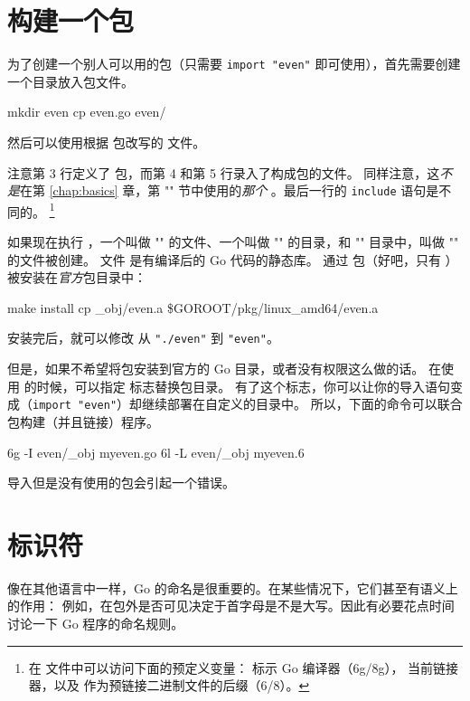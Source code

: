 \section{构建一个包}
\label{sec:building a package}
为了创建一个别人可以用的包（只需要 \lstinline{import "even"} 即可使用），首先需要创建一个目录放入包文件。
\begin{display}
\pr mkdir even
\pr cp even.go even/
\end{display}
\noindent{}然后可以使用根据  包改写的  文件。

注意第 3 行定义了  包，而第 4 和第 5 行录入了构成包的文件。
同样注意，这\emph{不是}在第 \ref{chap:basics} 章，第 ""
节中使用的\emph{那个} 。最后一行的 \verb|include| 语句是不同的。
\footnote{在  文件中可以访问下面的预定义变量：
 标示 Go 编译器（6g/8g），
 当前链接器，以及  作为预链接二进制文件的后缀（6/8）。}

如果现在执行 ，一个叫做 "" 的文件、一个叫做
"" 的目录，和 "" 目录中，叫做 "" 的文件被创建。
文件  是有编译后的 Go 代码的静态库。
通过  包（好吧，只有 ）被安装在\emph{官方}包目录中：
\begin{display}
\pr make install
cp \_obj/even.a \$GOROOT/pkg/linux\_amd64/even.a
\end{display}
\noindent{}安装完后，就可以修改  从
\lstinline{"./even"} 到 \lstinline{"even"}。

但是，如果不希望将包安装到官方的 Go 目录，或者没有权限这么做的话。
在使用  的时候，可以指定  标志替换包目录。
有了这个标志，你可以让你的导入语句变成（\lstinline{import "even"}）却继续部署在自定义的目录中。
所以，下面的命令可以联合包构建（并且链接）程序。
\begin{display}
\pr 6g -I even/\_obj myeven.go	
\pr 6l -L even/\_obj myeven.6	
\end{display}

\noindent{}导入但是没有使用的包会引起一个错误。

\section{标识符}
像在其他语言中一样，Go 的命名是很重要的。在某些情况下，它们甚至有语义上的作用：
例如，在包外是否可见决定于首字母是不是大写。因此有必要花点时间讨论一下 Go 程序的命名规则。

